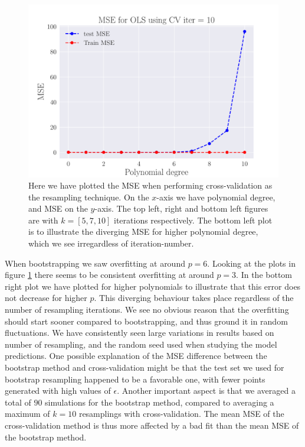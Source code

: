 \documentclass[reprint,english,notitlepage,aps,nobalancelastpage,nofootinbib]{revtex4-1}  %
\begin{document}
\begin{figure}[H]
	\endminipage\hfill
	\includegraphics[width=\linewidth]{MSE_OLS_n30_eps02_pol10_CV_re10.pdf}
	\endminipage
	\caption{Here we have plotted the MSE when performing cross-validation as the resampling technique. On the $x$-axis we have polynomial degree, and MSE on the $y$-axis. The top left, right and bottom left figures are with $k=[5, 7, 10]$ iterations respectively. The bottom left plot is to illustrate the diverging MSE for higher polynomial degree, which we see irregardless of iteration-number.} \label{fig:CV_OLS}
\end{figure}

When bootstrapping we saw overfitting at around $p=6$. Looking at the plots in figure \ref{fig:CV_OLS} there seems to be consistent overfitting at around $p=3$. In the bottom right plot we have plotted for higher polynomials to illustrate that this error does not decrease for higher $p$. This diverging behaviour takes place regardless of the number of resampling iterations. We see no obvious reason that the overfitting should start sooner compared to bootstrapping, and thus ground it in random fluctuations. We have consistently seen large variations in results based on number of resampling, and the random seed used when studying the model predictions. One possible explanation of the MSE difference between the bootstrap method and cross-validation might be that the test set we used for bootstrap resampling happened to be a favorable one, with fewer points generated with high values of $\epsilon$. Another important aspect is that we averaged a total of $90$ simulations for the bootstrap method, compared to averaging a maximum of $k=10$ resamplings with cross-validation. The mean MSE of the cross-validation method is thus more affected by a bad fit than the mean MSE of the bootstrap method.
\end{document}
